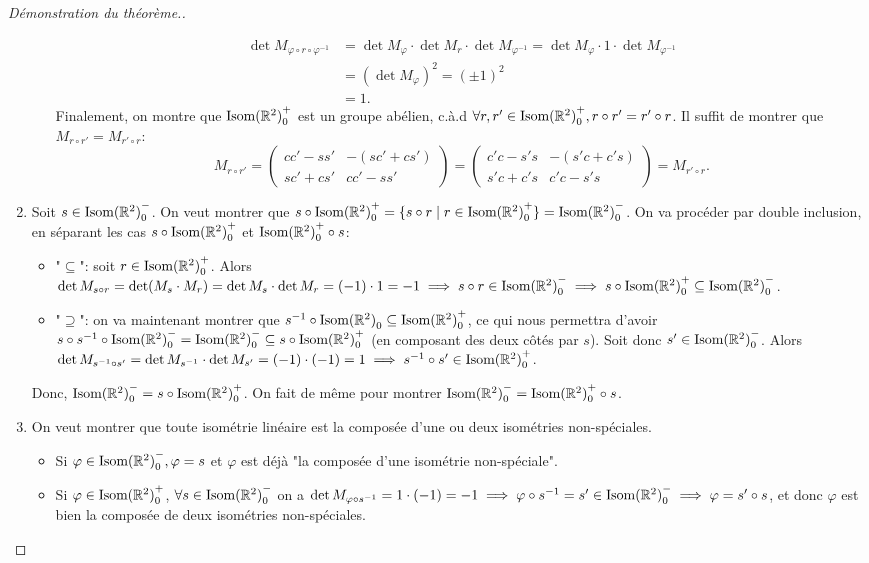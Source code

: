 \documentclass{book}
\numberwithin{equation}{section}
\renewcommand{\phi}{\varphi}
\providecommand{\plan}{{\mathbb R^2}}
\providecommand{\isom}{{\textnormal{Isom}(\plan)}}
\providecommand{\isomo}{{\isom_0}}
\providecommand{\isomop}{\isom_0^+}
\providecommand{\isomom}{\isom_0^-}
\providecommand{\tq}{\mid}
\begin{document}
\begin{proof}[Démonstration du théorème.]
\begin{enumerate}
\begin{itemize}
			\begin{align*}
				\det M_{\phi \circ r \circ \phi^{-1}} &= \det M_\phi \cdot \det M_r \cdot \det M_{\phi^{-1}} = \det M_\phi \cdot 1 \cdot \det M_{\phi^{-1}}\\
				&= (\det M_\phi)^2 = (\pm 1)^2\\
				&= 1.
			\end{align*}
			Finalement, on montre que $\isomop$ est un groupe abélien, c.à.d $\forall r, r' \in \isomop, r \circ r' = r' \circ r$. Il suffit de montrer que $M_{r \circ r'} = M_{r' \circ r}$:
			\begin{equation*}
				 M_{r \circ r'} = \begin{pmatrix}
				 	cc' - ss' & -(sc' + cs') \\
				 	sc' + cs' & cc' - ss'
				 \end{pmatrix} = \begin{pmatrix}
				 	c'c - s's & -(s'c + c's) \\
				 	s'c + c's & c'c - s's
				 \end{pmatrix}
				 = M_{r' \circ r}.
			\end{equation*}
		\end{itemize}
		
		\item Soit $s \in \isomom$. On veut montrer que $s \circ \isomop = \{s \circ r \tq r \in \isomop \} = \isomom$. On va procéder par double inclusion, en séparant les cas $s \circ \isomop$ et $\isomop \circ s$:
		\begin{itemize}
			\item "$\subseteq$": soit $r \in \isomop$. Alors $\det M_{s \circ r} = \det (M_s \cdot M_r) = \det M_s \cdot \det M_r = (-1) \cdot 1 = -1 \implies s \circ r \in \isomom \implies s \circ \isomop \subseteq \isomom$.
			\item "$\supseteq$": on va maintenant montrer que $s^{-1} \circ \isomo \subseteq \isomop$, ce qui nous permettra d'avoir $s \circ s^{-1} \circ \isomom = \isomom \subseteq s \circ \isomop$ (en composant des deux côtés par $s$). Soit donc $s' \in \isomom$. Alors $\det M_{s^{-1} \circ s'} = \det M_{s^{-1}} \cdot \det M_{s'} = (-1) \cdot (-1) = 1 \implies s^{-1} \circ s' \in \isomop$.
		\end{itemize}
		Donc, $\isomom = s \circ \isomop$. On fait de même pour montrer $\isomom = \isomop \circ s$.
		
		\item On veut montrer que toute isométrie linéaire est la composée d'une ou deux isométries non-spéciales.
		\begin{itemize}
			\item Si $\phi \in \isomom, \phi = s$ et $\phi$ est déjà "la composée d'une isométrie non-spéciale".
			\item Si $\phi \in \isomop$, $\forall s \in \isomom$ on a $\det M_{\phi \circ s^{-1}} = 1 \cdot (-1) = -1 \implies \phi \circ s^{-1} = s' \in \isomom \implies \phi = s' \circ s$, et donc $\phi$ est bien la composée de deux isométries non-spéciales.
		\end{itemize}
	\end{enumerate}
\end{proof}
\end{document}
